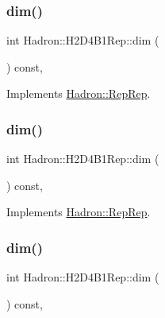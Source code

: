 \subsubsection{\texorpdfstring{dim()}{dim()}\hspace{0.1cm}{\footnotesize\ttfamily [3/5]}}
{\footnotesize\ttfamily int Hadron\+::\+H2\+D4\+B1\+Rep\+::dim (\begin{DoxyParamCaption}{ }\end{DoxyParamCaption}) const\hspace{0.3cm}{\ttfamily [inline]}, {\ttfamily [virtual]}}



Implements \mbox{\hyperlink{structHadron_1_1RepRep_a92c8802e5ed7afd7da43ccfd5b7cd92b}{Hadron\+::\+Rep\+Rep}}.

\mbox{\label{structHadron_1_1H2D4B1Rep_af795d001f668da987faaaf60a84878bb}} 
\subsubsection{\texorpdfstring{dim()}{dim()}\hspace{0.1cm}{\footnotesize\ttfamily [4/5]}}
{\footnotesize\ttfamily int Hadron\+::\+H2\+D4\+B1\+Rep\+::dim (\begin{DoxyParamCaption}{ }\end{DoxyParamCaption}) const\hspace{0.3cm}{\ttfamily [inline]}, {\ttfamily [virtual]}}



Implements \mbox{\hyperlink{structHadron_1_1RepRep_a92c8802e5ed7afd7da43ccfd5b7cd92b}{Hadron\+::\+Rep\+Rep}}.

\mbox{\label{structHadron_1_1H2D4B1Rep_af795d001f668da987faaaf60a84878bb}} 
\subsubsection{\texorpdfstring{dim()}{dim()}\hspace{0.1cm}{\footnotesize\ttfamily [5/5]}}
{\footnotesize\ttfamily int Hadron\+::\+H2\+D4\+B1\+Rep\+::dim (\begin{DoxyParamCaption}{ }\end{DoxyParamCaption}) const\hspace{0.3cm}{\ttfamily [inline]}, {\ttfamily [virtual]}}



